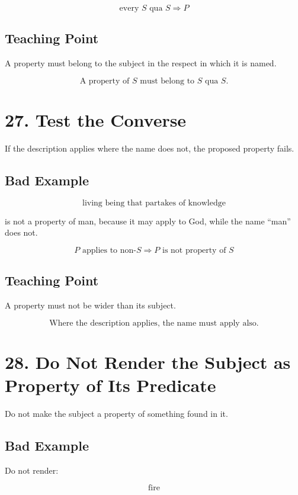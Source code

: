 \documentclass[12pt]{article}
\begin{document}
\[
\text{every } S \text{ qua } S \Rightarrow P
\]

\subsection*{Teaching Point}

A property must belong to the subject in the respect in which it is named.

\[
\boxed{
\text{A property of } S \text{ must belong to } S \text{ qua } S.
}
\]

\section*{27. Test the Converse}

If the description applies where the name does not, the proposed property fails.

\subsection*{Bad Example}

\[
\text{living being that partakes of knowledge}
\]

is not a property of man, because it may apply to God, while the name ``man''
does not.

\[
P \text{ applies to non-}S
\Rightarrow
P \text{ is not property of } S
\]

\subsection*{Teaching Point}

A property must not be wider than its subject.

\[
\boxed{
\text{Where the description applies, the name must apply also.}
}
\]

\section*{28. Do Not Render the Subject as Property of Its Predicate}

Do not make the subject a property of something found in it.

\subsection*{Bad Example}

Do not render:

\[
\text{fire}
\]
\end{document}
